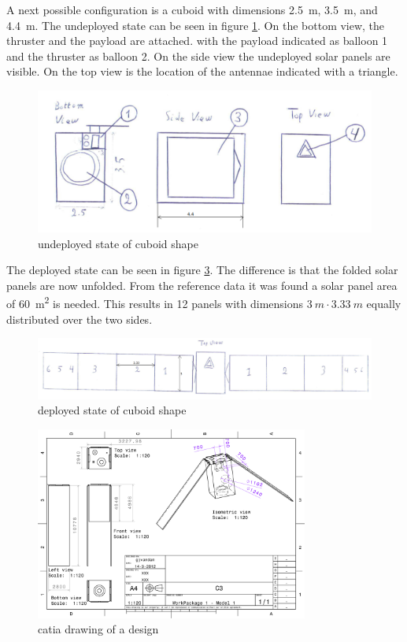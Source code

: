 A next possible configuration is a cuboid with
dimensions \SI{2.5}{m}, \SI{3.5}{m}, and \SI{4.4}{m}. The undeployed
state can be seen in figure \ref{sketch2}. On the bottom view, the
thruster and the payload are attached. with the payload indicated as
balloon 1 and the thruster as balloon 2. On the side view the
undeployed solar panels are visible. On the top view is the location
of the antennae indicated with a triangle.
\begin{figure}[ht]
  \centering
  \includegraphics[width=14cm]{boxundeployed}
  \caption{undeployed state of cuboid shape}
  \label{sketch2}
\end{figure}

The deployed state can be seen in figure \ref{sketch3}. The difference
is that the folded solar panels are now unfolded. From the reference
data it was found a solar panel area of \SI{60}{m^2} is needed. This
results in 12 panels with dimensions $\SI{3}{m}\cdot\SI{3.33}{m}$
equally distributed over the two sides.

\begin{figure}[ht]
  \centering
  \includegraphics[width=14cm]{boxdeployed}
  \caption{deployed state of cuboid shape}
  \label{sketch3}
\end{figure}


\begin{figure}[H]
  \centering
  \includegraphics[angle=90, width=0.8\textwidth]{catiadraw1}
  \caption{catia drawing of a design}
  \label{sketch3}
\end{figure}

